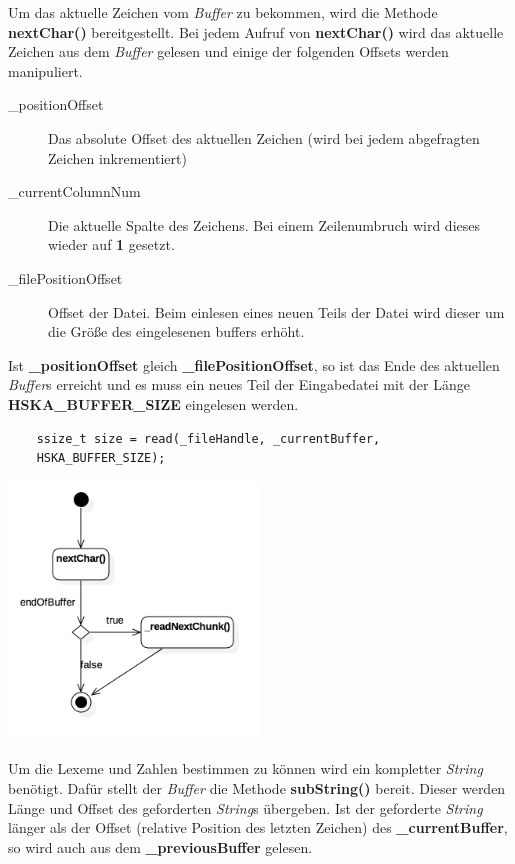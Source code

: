 \documentclass[
a4paper
]{scrreprt}
\begin{document}
	Um das aktuelle Zeichen vom \textit{Buffer} zu bekommen, wird die Methode \textbf{nextChar()} bereitgestellt. Bei jedem Aufruf von \textbf{nextChar()} wird das aktuelle Zeichen aus dem \textit{Buffer} gelesen und einige der folgenden Offsets werden manipuliert.
	\begin{description}
		\item[\_positionOffset] Das absolute Offset des aktuellen Zeichen (wird bei jedem abgefragten Zeichen inkrementiert)
		\item[\_currentColumnNum] Die aktuelle Spalte des Zeichens. Bei einem Zeilenumbruch wird dieses wieder auf \textbf{1} gesetzt.
		\item[\_filePositionOffset] Offset der Datei. Beim einlesen eines neuen Teils der Datei wird dieser um die Größe des eingelesenen buffers erhöht. 
	\end{description}
	
	Ist \textbf{\_positionOffset} gleich \textbf{\_filePositionOffset}, so ist das Ende des aktuellen \textit{Buffer}s erreicht und es muss ein neues Teil der Eingabedatei mit der Länge \textbf{HSKA\_BUFFER\_SIZE} eingelesen werden.
	\begin{lstlisting}
	ssize_t size = read(_fileHandle, _currentBuffer, 
	HSKA_BUFFER_SIZE);
	\end{lstlisting}
	
	\begin{center}
		\includegraphics[width=0.5\textwidth]{./images/buffer_activity.png}
	\end{center}
	
	Um die Lexeme und Zahlen bestimmen zu können wird ein kompletter \textit{String} benötigt. Dafür stellt der \textit{Buffer} die Methode \textbf{subString()} bereit. Dieser werden Länge und Offset des geforderten \textit{String}s übergeben.
	Ist der geforderte \textit{String} länger als der Offset (relative Position des letzten Zeichen) des \textbf{\_currentBuffer}, so wird auch aus dem \textbf{\_previousBuffer} gelesen.
	
\end{document}
